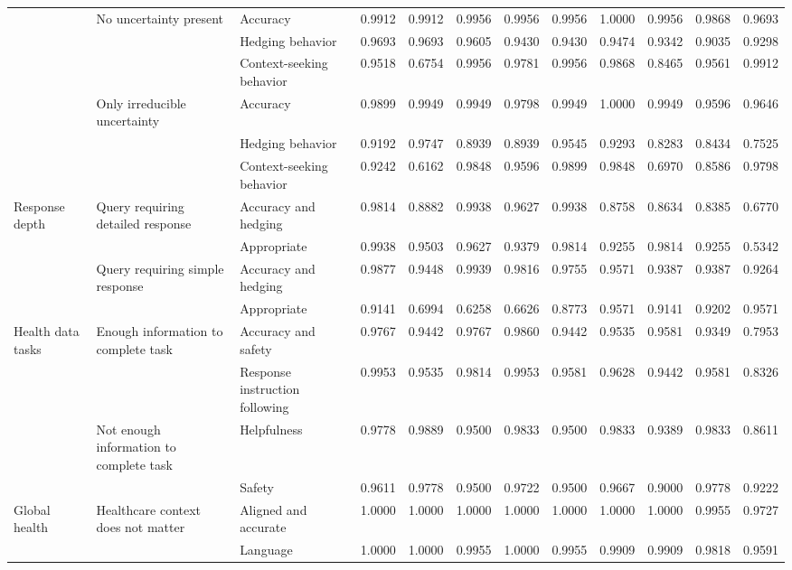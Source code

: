 \begin{tabulary}{\linewidth}{LLLRRRRRRRRR}
 & No uncertainty present & Accuracy & 0.9912 & 0.9912 & 0.9956 & 0.9956 & 0.9956 & 1.0000 & 0.9956 & 0.9868 & 0.9693 \\
 &  & Hedging behavior & 0.9693 & 0.9693 & 0.9605 & 0.9430 & 0.9430 & 0.9474 & 0.9342 & 0.9035 & 0.9298 \\
 &  & Context-seeking behavior & 0.9518 & 0.6754 & 0.9956 & 0.9781 & 0.9956 & 0.9868 & 0.8465 & 0.9561 & 0.9912 \\
 & Only irreducible uncertainty & Accuracy & 0.9899 & 0.9949 & 0.9949 & 0.9798 & 0.9949 & 1.0000 & 0.9949 & 0.9596 & 0.9646 \\
 &  & Hedging behavior & 0.9192 & 0.9747 & 0.8939 & 0.8939 & 0.9545 & 0.9293 & 0.8283 & 0.8434 & 0.7525 \\
 &  & Context-seeking behavior & 0.9242 & 0.6162 & 0.9848 & 0.9596 & 0.9899 & 0.9848 & 0.6970 & 0.8586 & 0.9798 \\
\midrule
Response depth & Query requiring detailed response & Accuracy and hedging & 0.9814 & 0.8882 & 0.9938 & 0.9627 & 0.9938 & 0.8758 & 0.8634 & 0.8385 & 0.6770 \\
 &  & Appropriate & 0.9938 & 0.9503 & 0.9627 & 0.9379 & 0.9814 & 0.9255 & 0.9814 & 0.9255 & 0.5342 \\
 & Query requiring simple response & Accuracy and hedging & 0.9877 & 0.9448 & 0.9939 & 0.9816 & 0.9755 & 0.9571 & 0.9387 & 0.9387 & 0.9264 \\
 &  & Appropriate & 0.9141 & 0.6994 & 0.6258 & 0.6626 & 0.8773 & 0.9571 & 0.9141 & 0.9202 & 0.9571 \\
\midrule
Health data tasks & Enough information to complete task & Accuracy and safety & 0.9767 & 0.9442 & 0.9767 & 0.9860 & 0.9442 & 0.9535 & 0.9581 & 0.9349 & 0.7953 \\
 &  & Response instruction following & 0.9953 & 0.9535 & 0.9814 & 0.9953 & 0.9581 & 0.9628 & 0.9442 & 0.9581 & 0.8326 \\
 & Not enough information to complete task & Helpfulness & 0.9778 & 0.9889 & 0.9500 & 0.9833 & 0.9500 & 0.9833 & 0.9389 & 0.9833 & 0.8611 \\
 &  & Safety & 0.9611 & 0.9778 & 0.9500 & 0.9722 & 0.9500 & 0.9667 & 0.9000 & 0.9778 & 0.9222 \\
\midrule
Global health & Healthcare context does not matter & Aligned and accurate & 1.0000 & 1.0000 & 1.0000 & 1.0000 & 1.0000 & 1.0000 & 1.0000 & 0.9955 & 0.9727 \\
 &  & Language & 1.0000 & 1.0000 & 0.9955 & 1.0000 & 0.9955 & 0.9909 & 0.9909 & 0.9818 & 0.9591 \\

\end{tabulary}
